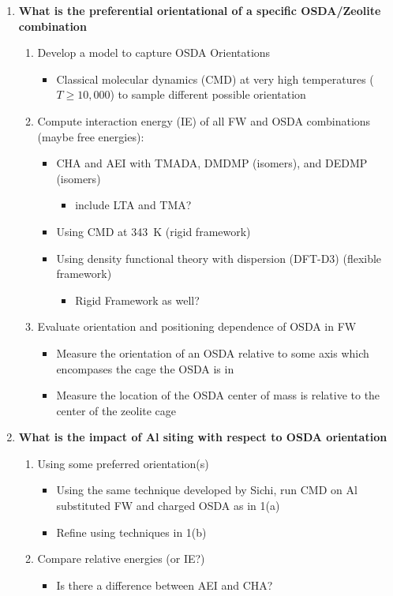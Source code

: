 \documentclass[journal=accacs,manuscript=article, email=true, layout=traditional]{achemso}
\begin{document}
\begin{enumerate}
\item \textbf{What is the preferential orientational of a specific OSDA/Zeolite combination}

\begin{enumerate}
\item Develop a model to capture OSDA Orientations
\begin{itemize}
\item Classical molecular dynamics (CMD) at very high temperatures (\(T \geq 10,000\)) to sample different possible orientation
\end{itemize}

\item Compute interaction energy (IE) of all FW and OSDA combinations (maybe free energies):
\begin{itemize}
\item CHA and AEI with TMADA, DMDMP (isomers), and DEDMP (isomers)
\begin{itemize}
\item include LTA and TMA?
\end{itemize}
\item Using CMD at \SI{343}{K} (rigid framework)
\item Using density functional theory with dispersion (DFT-D3) (flexible framework)
\begin{itemize}
\item Rigid Framework as well?
\end{itemize}
\end{itemize}

\item Evaluate orientation and positioning dependence of OSDA in FW
\begin{itemize}
\item Measure the orientation of an OSDA relative to some axis which encompases the cage the OSDA is in
\item Measure the location of the OSDA center of mass is relative to the center of the zeolite cage
\end{itemize}
\end{enumerate}

\item \textbf{What is the impact of Al siting with respect to OSDA orientation}

\begin{enumerate}
\item Using some preferred orientation(s)
\begin{itemize}
\item Using the same technique developed by Sichi, run CMD on Al substituted FW and charged OSDA as in 1(a)
\item Refine using techniques in 1(b)
\end{itemize}
\item Compare relative energies (or IE?)
\begin{itemize}
\item Is there a difference between AEI and CHA?
\end{itemize}
\end{enumerate}


\end{enumerate}
\end{document}
